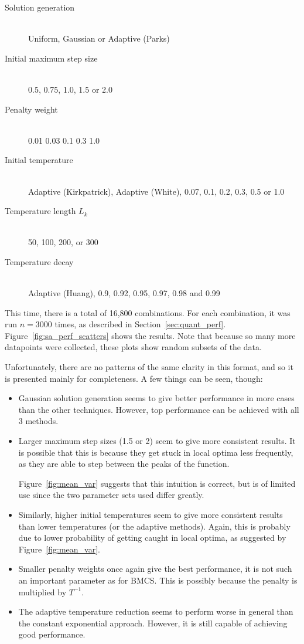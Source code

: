 \documentclass[10pt]{article}
\begin{document}
\begin{description}
  \item[Solution generation] \hfill \\
    Uniform, Gaussian or Adaptive (Parks)
  \item[Initial maximum step size] \hfill \\
    0.5, 0.75, 1.0, 1.5 or 2.0
  \item[Penalty weight] \hfill \\
    0.01 0.03 0.1 0.3 1.0
  \item[Initial temperature] \hfill \\
    Adaptive (Kirkpatrick), Adaptive (White), 0.07,
    0.1, 0.2, 0.3, 0.5 or 1.0
  \item[Temperature length $L_k$] \hfill \\
    50, 100, 200, or 300
  \item[Temperature decay] \hfill \\
    Adaptive (Huang), 0.9, 0.92, 0.95, 0.97, 0.98 and
    0.99
    \end{description}

This time, there is a total of 16,800 combinations. For each combination, it
was run $n = 3000$ times, as described in Section~\ref{sec:quant_perf}.
Figure~\ref{fig:sa_perf_scatters} shows the results. Note that because so many
more datapoints were collected, these plots show random subsets of the data.

Unfortunately, there are no patterns of the same clarity in this format, and
so it is presented mainly for completeness. A few things can be seen, though:

\begin{itemize}
  \item Gaussian solution generation seems to give better performance in more
    cases than the other techniques. However, top performance can be achieved
    with all 3 methods.
  \item Larger maximum step sizes (1.5 or 2) seem to give more consistent
    results. It is possible that this is because they get stuck in local
    optima less frequently, as they are able to step between the peaks of the
    function.

    Figure~\ref{fig:mean_var} suggests that this intuition is correct, but is
    of limited use since the two parameter sets used differ greatly.

  \item Similarly, higher initial temperatures seem to give more consistent
    results than lower temperatures (or the adaptive methods). Again, this is
    probably due to lower probability of getting caught in local optima, as
    suggested by Figure~\ref{fig:mean_var}.
  \item Smaller penalty weights once again give the best performance, it is
    not such an important parameter as for BMCS. This is possibly because the
    penalty is multiplied by $T^{-1}$.
  \item The adaptive temperature reduction seems to perform worse in general
    than the constant exponential approach. However, it is still capable of
    achieving good performance.
    \end{itemize}
\end{document}
